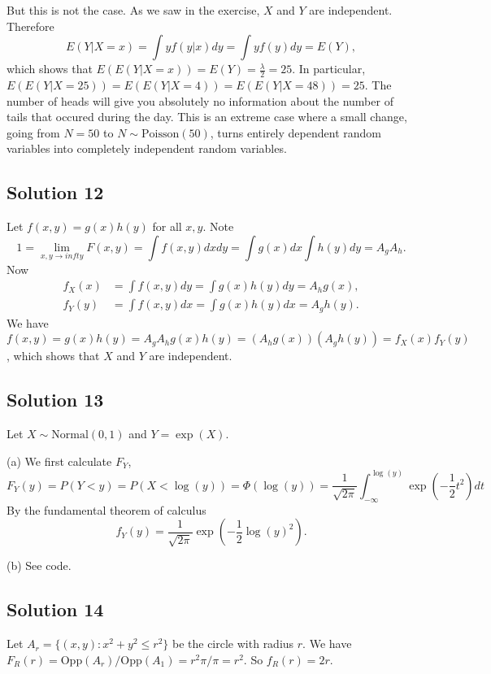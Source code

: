 But this is not the case.
As we saw in the exercise, $X$ and $Y$ are independent.
Therefore
$$
E(Y | X = x) = \int y f(y|x) dy = \int y f(y) dy = E(Y),
$$
which shows that $E(E(Y | X = x)) = E(Y) = \frac{\lambda}{2} = 25$.
In particular, $E(E(Y | X = 25)) = E(E(Y | X = 4)) = E(E(Y | X = 48)) = 25$.
The number of heads will give you absolutely no information about the number of tails that occured during the day.
This is an extreme case where a small change, going from $N = 50$ to $N \sim \mathrm{Poisson}(50)$, turns entirely dependent random variables into completely independent random variables.


\subsection*{Solution 12}

Let $f(x, y) = g(x) h(y)$ for all $x, y$.
Note
$$
1 = \lim_{x, y \to infty} F(x, y) = \int f(x, y) dx dy = \int g(x) dx \int h(y) dy = A_g A_h.
$$
Now
\begin{equation*}
    \begin{split}
        f_X(x) &= \int f(x, y) dy = \int g(x) h(y) dy = A_h g(x), \\
        f_Y(y) &= \int f(x, y) dx = \int g(x) h(y) dx = A_g h(y).
    \end{split}
\end{equation*}
We have $f(x, y) = g(x) h(y) = A_g A_h g(x) h(y) = (A_h g(x))(A_g h(y)) = f_X(x) f_Y(y)$, which shows that $X$ and $Y$ are independent.


\subsection*{Solution 13}

Let $X \sim \mathrm{Normal}(0, 1)$ and $Y = \exp(X)$.

(a) We first calculate $F_Y$,
\begin{equation*}
F_Y(y) = P(Y < y)
    = P(X < \log(y))
    = \Phi(\log(y))
    = \frac{1}{\sqrt{2\pi}} \int_{-\infty}^{\log(y)} \exp\left(-\frac{1}{2} t^2\right) dt
\end{equation*}
By the fundamental theorem of calculus
$$
f_Y(y) = \frac{1}{\sqrt{2\pi}} \exp\left(-\frac{1}{2} \log(y)^2\right).
$$

(b) See code.


\subsection*{Solution 14}

Let $A_r = \{(x, y) : x^2 + y^2 \leq r^2\}$ be the circle with radius $r$.
We have $F_R(r) = \mathrm{Opp}(A_r) / \mathrm{Opp}(A_1) = r^2 \pi / \pi = r^2$.
So $f_R(r) = 2r$.
